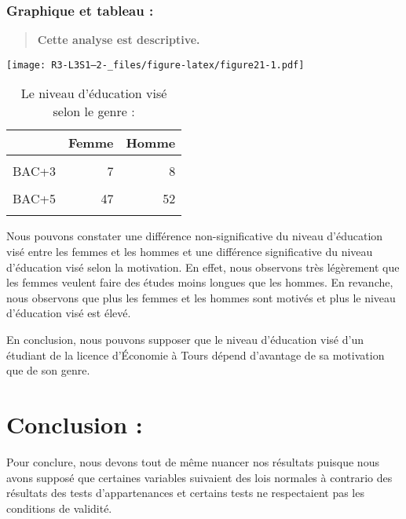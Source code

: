 \documentclass[
  11pt,
  french,
]{article}
\begin{document}
\hypertarget{graphique-et-tableau}{%
\subsubsection{Graphique et tableau :}\label{graphique-et-tableau}}

\begin{quote}
\textbf{Cette analyse est descriptive.}
\end{quote}

\texttt{[image: R3-L3S1--2-\_files/figure-latex/figure21-1.pdf]}

\begin{table}[!h]

\caption{\label{tab:table10}Le niveau d'éducation visé selon le genre :}
\centering
\begin{tabular}[t]{lrr}
\toprule
  & Femme & Homme\\
\midrule
\cellcolor{gray!6}{BAC+2} & \cellcolor{gray!6}{1} & \cellcolor{gray!6}{1}\\
BAC+3 & 7 & 8\\
\cellcolor{gray!6}{BAC+4} & \cellcolor{gray!6}{0} & \cellcolor{gray!6}{1}\\
BAC+5 & 47 & 52\\
\cellcolor{gray!6}{BAC+5 ET +} & \cellcolor{gray!6}{10} & \cellcolor{gray!6}{19}\\
\bottomrule
\end{tabular}
\end{table}

Nous pouvons constater une différence non-significative du niveau
d'éducation visé entre les femmes et les hommes et une différence
significative du niveau d'éducation visé selon la motivation. En effet,
nous observons très légèrement que les femmes veulent faire des études
moins longues que les hommes. En revanche, nous observons que plus les
femmes et les hommes sont motivés et plus le niveau d'éducation visé est
élevé.

En conclusion, nous pouvons supposer que le niveau d'éducation visé d'un
étudiant de la licence d'Économie à Tours dépend d'avantage de sa
motivation que de son genre.

\hypertarget{conclusion}{%
\section{Conclusion :}\label{conclusion}}

Pour conclure, nous devons tout de même nuancer nos résultats puisque
nous avons supposé que certaines variables suivaient des lois normales à
contrario des résultats des tests d'appartenances et certains tests ne
respectaient pas les conditions de validité.
\end{document}
